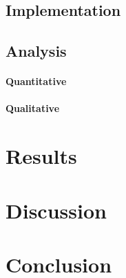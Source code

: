 \documentclass{isprs}
\begin{document}




\subsection{Implementation}

\subsection{Analysis}

\paragraph{Quantitative}

\paragraph{Qualitative}

\section{Results}\label{sec:results}



\section{Discussion}\label{sec:discussion}



\section{Conclusion}\label{sec:conclusion}

\end{document}
